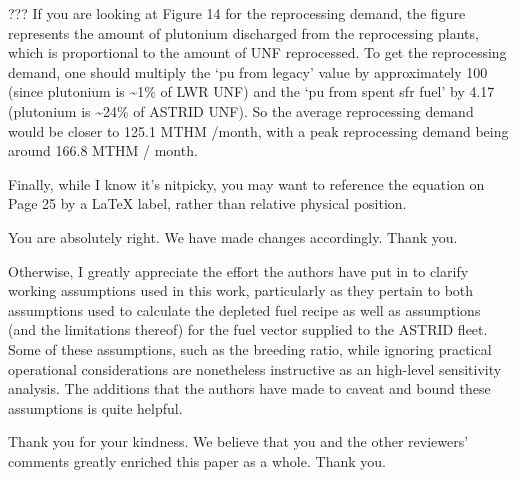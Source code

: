 \documentclass[answers,11pt]{exam}
\begin{document}
\begin{questions}
    \begin{solution}
        ???
        If you are looking at Figure 14 for the reprocessing demand, the figure
        represents the amount of plutonium discharged from the reprocessing plants,
        which is proportional to the amount of \gls{UNF} reprocessed. To get the
        reprocessing demand, one should multiply the `pu from legacy' value by
        approximately 100 (since plutonium is \textasciitilde 1\% of \gls{LWR} \gls{UNF})
        and the `pu from spent sfr fuel' by 4.17 (plutonium is \textasciitilde 24\% of
        ASTRID \gls{UNF}). So the average reprocessing demand would be closer to
        125.1 MTHM /month, with a peak reprocessing demand being around 166.8 MTHM / month.

    \end{solution}

    \question Finally, while I know it's nitpicky, you may want to reference the equation on Page 25 by a LaTeX label, rather than relative physical position.

    \begin{solution}
    You are absolutely right. We have made changes accordingly.
    Thank you.
    \end{solution}

    \question Otherwise, I greatly appreciate the effort the authors have put in to clarify working assumptions used in this work,
    particularly as they pertain to both assumptions used to calculate the depleted fuel recipe as well as assumptions (and the limitations thereof)
    for the fuel vector supplied to the ASTRID fleet. Some of these assumptions, such as the breeding ratio,
    while ignoring practical operational considerations are nonetheless instructive as an high-level sensitivity analysis.
    The additions that the authors have made to caveat and bound these assumptions is quite helpful.

    \begin{solution}
    Thank you for your kindness. We believe that you and the other reviewers' comments greatly enriched
    this paper as a whole. Thank you.
    \end{solution}






\end{questions}
%
%
\end{document}
